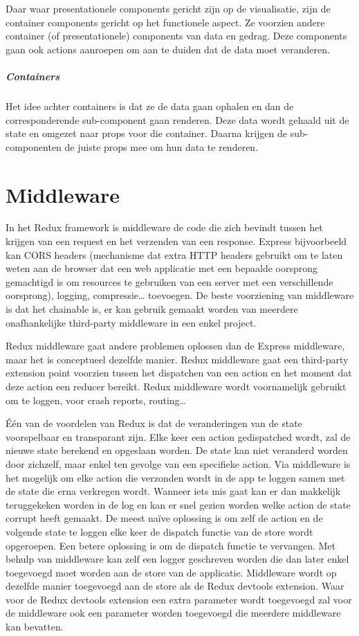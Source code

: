 Daar waar presentationele components gericht zijn op de visualisatie, zijn de container components gericht op het functionele aspect. Ze voorzien andere container (of presentationele) components van data en gedrag. Deze components gaan ook actions aanroepen om aan te duiden dat de data moet veranderen.  
\autocite{prescon}
\autocite{prescon2}

\subparagraph{Containers}
Het idee achter containers is dat ze de data gaan ophalen en dan de corresponderende sub-component gaan renderen. Deze data wordt gehaald uit de state en omgezet naar props voor die container. Daarna krijgen de sub-componenten de juiste props mee om hun data te renderen. 
\autocite{containercomp}

\section{Middleware}
In het Redux framework is middleware de code die zich bevindt tussen het krijgen van een request en het verzenden van een response. Express bijvoorbeeld kan CORS headers (mechanisme dat extra HTTP headers gebruikt om te laten weten aan de browser dat een web applicatie met een bepaalde oorsprong gemachtigd is om resources te gebruiken van een server met een verschillende oorsprong), logging, compressie… toevoegen. De beste voorziening van middleware is dat het chainable is, er kan gebruik gemaakt worden van meerdere onafhankelijke third-party middleware in een enkel project.
 
Redux middleware gaat andere problemen oplossen dan de Express middleware, maar het is conceptueel dezelfde manier. Redux middleware gaat een third-party extension point voorzien tussen het dispatchen van een action en het moment dat deze action een reducer bereikt. Redux middleware wordt voornamelijk gebruikt om te loggen, voor crash reports, routing…

Één van de voordelen van Redux is dat de veranderingen van de state voorspelbaar en transparant zijn. Elke keer een action gedispatched wordt, zal de nieuwe state berekend en opgeslaan worden. De state kan niet veranderd worden door zichzelf, maar enkel ten gevolge van een specifieke action. Via middleware is het mogelijk om elke action die verzonden wordt in de app te loggen samen met de state die erna verkregen wordt. Wanneer iets mis gaat kan er dan makkelijk teruggekeken worden in de log en kan er snel gezien worden welke action de state corrupt heeft gemaakt. De meest naïve oplossing is om zelf de action en de volgende state te loggen elke keer de dispatch functie van de store wordt opgeroepen. Een betere oplossing is om de dispatch functie te vervangen. Met behulp van middleware kan zelf een logger geschreven worden die dan later enkel toegevoegd moet worden aan de store van de applicatie. Middleware wordt op dezelfde manier toegevoegd aan de store als de Redux devtools extension. Waar voor de Redux devtools extension een extra parameter wordt toegevoegd zal voor de middleware ook een parameter worden toegevoegd die meerdere middleware kan bevatten. 
\autocite{Redux02}

